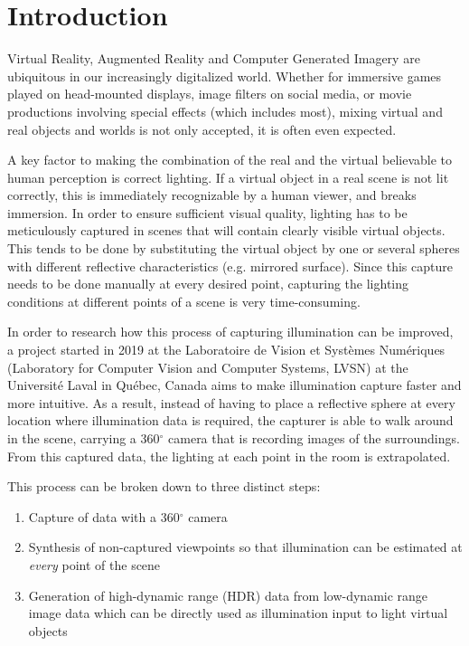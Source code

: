 \chapter{Introduction}

Virtual Reality, Augmented Reality and Computer Generated Imagery are ubiquitous in our increasingly digitalized world. Whether for immersive games played on head-mounted displays, image filters on social media, or movie productions involving special effects (which includes most), mixing virtual and real objects and worlds is not only accepted, it is often even expected.

A key factor to making the combination of the real and the virtual believable to human perception is correct lighting. If a virtual object in a real scene is not lit correctly, this is immediately recognizable by a human viewer, and breaks immersion. In order to ensure sufficient visual quality, lighting has to be meticulously captured in scenes that will contain clearly visible virtual objects. This tends to be done by substituting the virtual object by one or several spheres with different reflective characteristics (e.g. mirrored surface). Since this capture needs to be done manually at every desired point, capturing the lighting conditions at different points of a scene is very time-consuming.

In order to research how this process of capturing illumination can be improved, a project started in 2019 at the Laboratoire de Vision et Syst\` emes Num\' eriques (Laboratory for Computer Vision and Computer Systems, LVSN) at the Universit\'e Laval in Qu\'ebec, Canada aims to make illumination capture faster and more intuitive. 
As a result, instead of having to place a reflective sphere at every location where illumination data is required, the capturer is able to walk around in the scene, carrying a 360$^{\circ}$ camera that is recording images of the surroundings. From this captured data, the lighting at each point in the room is extrapolated.

This process can be broken down to three distinct steps:
\begin{enumerate}
\item Capture of data with a 360$^{\circ}$ camera
\item Synthesis of non-captured viewpoints so that illumination can be estimated at \emph{every} point of the scene
\item Generation of high-dynamic range (HDR) data from low-dynamic range image data which can be directly used as illumination input to light virtual objects
\end{enumerate}

